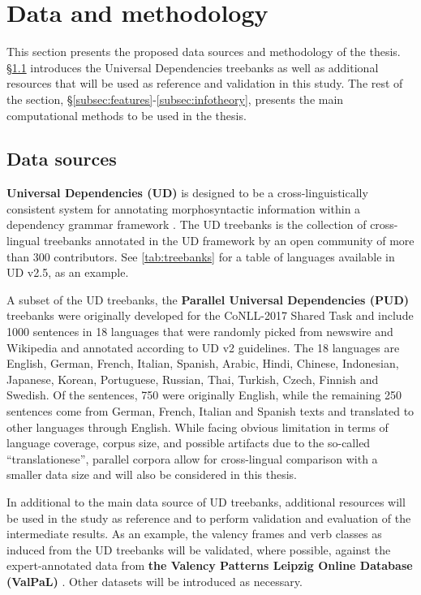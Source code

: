 \section{Data and methodology}\label{sec:methodology}

This section presents the proposed data sources and methodology of the thesis. \S\ref{subsec:data-sources} introduces the Universal Dependencies treebanks as well as additional resources that will be used as reference and validation in this study. The rest of the section, \S\ref{subsec:features}-\ref{subsec:infotheory}, presents the main computational methods to be used in the thesis.

\subsection{Data sources}\label{subsec:data-sources}

\textbf{Universal Dependencies (UD)} is designed to be a cross-linguistically consistent system for annotating morphosyntactic information within a dependency grammar framework \citep{demarneffe2021}. The UD treebanks \citep{universaldep} is the collection of cross-lingual treebanks annotated in the UD framework by an open community of more than 300 contributors. See \ref{tab:treebanks} for a table of languages available in UD v2.5, as an example.



A subset of the UD treebanks, the \textbf{Parallel Universal Dependencies (PUD)} treebanks were originally developed for the CoNLL-2017 Shared Task \citep{zeman2017} and include 1000 sentences in 18 languages that were randomly picked from newswire and Wikipedia and annotated according to UD v2 guidelines. The 18 languages are English, German, French, Italian, Spanish, Arabic, Hindi, Chinese, Indonesian, Japanese, Korean, Portuguese, Russian, Thai, Turkish, Czech, Finnish and Swedish. Of the sentences, 750 were originally English, while the remaining 250 sentences come from German, French, Italian and Spanish texts and translated to other languages through English. While facing obvious limitation in terms of language coverage, corpus size, and possible artifacts due to the so-called ``translationese'', parallel corpora allow for cross-lingual comparison with a smaller data size and will also be considered in this thesis.

In additional to the main data source of UD treebanks, additional resources will be used in the study as reference and to perform validation and evaluation of the intermediate results. As an example, the valency frames and verb classes as induced from the UD treebanks will be validated, where possible, against the expert-annotated data from \textbf{the Valency Patterns Leipzig Online Database (ValPaL)} \citep{valpal}. Other datasets will be introduced as necessary.

